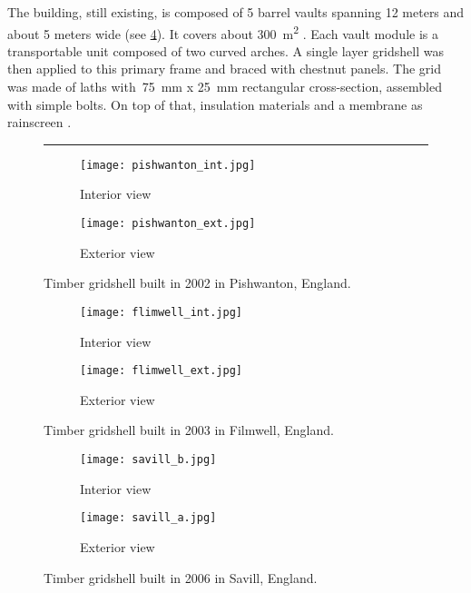 The building, still existing, is composed of 5 barrel vaults spanning 12 meters and about 5 meters wide (see \cref{fig:flimwell_b}). It covers about \SI{300}{m^2} \cite{Lowenstein2004}. Each vault module is a transportable unit composed of two curved arches. A single layer gridshell was then applied to this primary frame and braced with chestnut panels. The grid was made of laths with~\SI{75}{mm} x \SI{25}{mm} rectangular cross-section, assembled with simple bolts. On top of that, insulation materials and a membrane as rainscreen \cite{FourthDoor2003}.

\begin{figure}[t]
	\hrule
	\begin{subfigure}[b]{\TwoMediaWidth}
		\texttt{[image: pishwanton\_int.jpg]}
		\caption{Interior view}
		\label{fig:pishwanton_a}
	\end{subfigure}%
	\hspace{\MediaGutterWidth}%
	\begin{subfigure}[b]{\TwoMediaWidth}
		\texttt{[image: pishwanton\_ext.jpg]}
		\caption{Exterior view}
		\label{fig:pishwanton_b}
	\end{subfigure}
	\caption[Timber gridshell built in 2002 in Pishwanton, England]{Timber gridshell built in 2002 in Pishwanton, England.}
	\label{fig:pishwanton}
	\subfigskip
	\begin{subfigure}[b]{\TwoMediaWidth}
		\texttt{[image: flimwell\_int.jpg]}
		\caption{Interior view}
		\label{fig:flimwell_a}
	\end{subfigure}%
	\hspace{\MediaGutterWidth}%
	\begin{subfigure}[b]{\TwoMediaWidth}
		\texttt{[image: flimwell\_ext.jpg]}
		\caption{Exterior view}
		\label{fig:flimwell_b}
	\end{subfigure}
	\caption[Timber gridshell built in 2003 in Filmwell, England]{Timber gridshell built in 2003 in Filmwell, England.}
	\label{fig:flimwell}
	\subfigskip
	\begin{subfigure}[b]{\TwoMediaWidth}
		\texttt{[image: savill\_b.jpg]}
		\caption{Interior view}
		\label{fig:savill_a}
	\end{subfigure}%
	\hspace{\MediaGutterWidth}%
	\begin{subfigure}[b]{\TwoMediaWidth}
		\texttt{[image: savill\_a.jpg]}
		\caption{Exterior view}
		\label{fig:savill_b}
	\end{subfigure}
	\caption[Timber gridshell built in 2006 in Savill, England]{Timber gridshell built in 2006 in Savill, England.}
	\label{fig:savill}
\end{figure}

